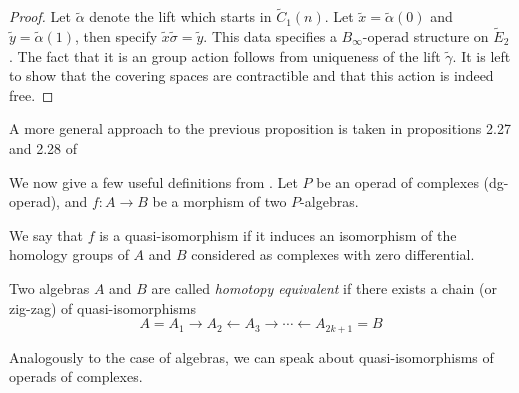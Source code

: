 \documentclass[TFM.tex]{subfiles}
\begin{document}
\begin{proof}
Let $\widetilde{\alpha}$ denote the lift which starts in $\widetilde{C}_1(n)$. Let $\widetilde{x}=\widetilde{\alpha}(0)$ and $\widetilde{y}=\widetilde{\alpha}(1)$, then specify $\widetilde{x}\widetilde{\sigma}=\widetilde{y}$. %
This data specifies a $B_\infty$-operad structure on $\widetilde{E}_2$. The fact that it is an group action follows from uniqueness of the lift $\widetilde{\gamma}$. It is left to show that the covering spaces are contractible and that this action is indeed free. %
\end{proof}

A more general approach to the previous proposition is taken in propositions 2.27 and 2.28 of \cite{tesis}

We now give a few useful definitions from \cite[]{Kontsevich}. Let $P$ be an operad of complexes (dg-operad), and $f : A→B$ be a morphism of two $P$-algebras.
\begin{defi}
We say that $f$ is a quasi-isomorphism if it induces an isomorphism of the homology
groups of $A$ and $B$ considered as complexes with zero differential.
\end{defi}

\begin{defi}
Two algebras $A$ and $B$ are called \emph{homotopy equivalent} if there exists a chain (or zig-zag) of quasi-isomorphisms
\[
A= A_1→A_2←A_3→\cdots←A_{2k+1} = B
\]
\end{defi}

Analogously to the case of algebras, we can speak about quasi-isomorphisms of operads
of complexes.
\end{document}
